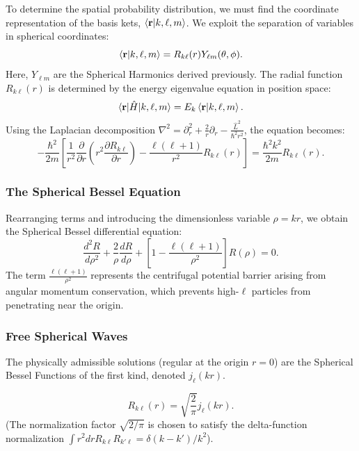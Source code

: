 To determine the spatial probability distribution, we must find the coordinate
representation of the basis kets, $\braket{\mathbf{r} | k, \ell, m}$. We exploit
the separation of variables in spherical coordinates:
\begin{equation}
	\braket{\mathbf{r} | k, \ell, m} = R_{k\ell}(r) Y_{\ell m}(\theta, \phi).
\end{equation}
Here, $Y_{\ell m}$ are the Spherical Harmonics derived previously. The radial
function $R_{k\ell}(r)$ is determined by the energy eigenvalue equation in
position space:
\begin{equation}
	\braket{\mathbf{r} | \hat{H} | k, \ell, m} = E_k \braket{\mathbf{r} |k,
	\ell, m}.
\end{equation}
Using the Laplacian decomposition $\nabla^2 = \partial_r^2 + \frac{2}{r}
\partial_r - \frac{\hat{L}^2}{\hbar^2 r^2}$, the equation becomes:
\begin{equation}
	-\frac{\hbar^2}{2m} \left[ \frac{1}{r^2} \frac{\partial}{\partial r} \left(
		r^2 \frac{\partial R_{k\ell}}{\partial r} \right) -
	\frac{\ell(\ell+1)}{r^2} R_{k\ell}(r) \right] = \frac{\hbar^2 k^2}{2m}
	R_{k\ell}(r).
\end{equation}

\subsubsection{The Spherical Bessel Equation}
Rearranging terms and introducing the dimensionless variable $\rho = kr$, we
obtain the Spherical Bessel differential equation:
\begin{equation}
	\frac{d^2 R}{d\rho^2} + \frac{2}{\rho} \frac{dR}{d\rho} + \left[ 1 -
	\frac{\ell(\ell+1)}{\rho^2} \right] R(\rho) = 0.
\end{equation}
The term $\frac{\ell(\ell+1)}{\rho^2}$ represents the centrifugal potential
barrier arising from angular momentum conservation, which prevents high-$\ell$
particles from penetrating near the origin.

\subsubsection{Free Spherical Waves}
The physically admissible solutions (regular at the origin $r=0$) are the
Spherical Bessel Functions of the first kind, denoted $j_\ell(kr)$.

\begin{equation}
	R_{k\ell}(r) = \sqrt{\frac{2}{\pi}} j_\ell(kr).
\end{equation}
(The normalization factor $\sqrt{2/\pi}$ is chosen to satisfy the delta-function
normalization $\int r^2 dr R_{k\ell} R_{k'\ell} = \delta(k-k')/k^2$).

